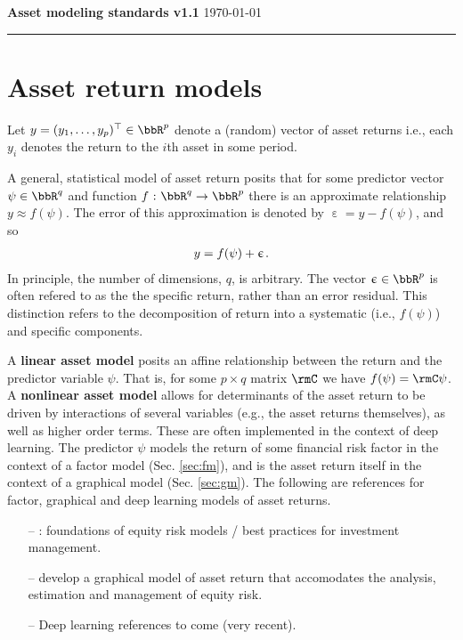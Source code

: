 \documentclass[leqno,12pt]{article}
\begin{document}
\ifxetex
  \let\lsum\sum
  \renewcommand{\sum}{\bm{\lsum}}

  \let\lprod\prod
  \renewcommand{\prod}{\bm{\lprod}}
\else
\fi

\newcommand{\res}{\upepsilon}
\newcommand{\pre}{\psi}
\newcommand{\mv}{\sigma_\rmM}
\newcommand{\mb}{\beta^{\rmM}}
\newcommand{\tcov}{\Sigma}
\newcommand{\hcov}{\bm{\hat}{\Sigma}}

{
\noindent
{\bf Asset modeling standards v1.1}
\noindent
\hfill {\today} \noindent
\rule{\textwidth}{0.01in}

\section{Asset return models}


\begin{mdframed}[style=clean]
Let $y = (y_1, \dots, y_p)^\top \in \bbR^p$ denote a (random) 
vector of asset returns i.e., 
each $y_i$ denotes the return
to the $i$th asset in some period.
\end{mdframed}



A general, statistical model of asset return posits that
for some predictor vector $\pre \in \bbR^q$ and 
function $f \cst \bbR^q \to \bbR^p$ there is an
approximate relationship $y \approx f(\pre)$. The error 
of this 
approximation is denoted by $\res = y - f(\pre)$, and so
\begin{align}
  y = f(\pre) + \res \s .
\end{align}
In principle, the number of dimensions, $q$, is arbitrary.
The vector $\res \in \bbR^p$ is often refered to as the 
the specific return, rather than an error residual. This
distinction refers to the decomposition of return 
into a systematic (i.e., $f(\pre)$) and specific components.

A {\bf linear asset model} posits an affine relationship
between the return and the predictor variable $\pre$.
That is, for some $p \times q$ matrix $\rmC$ we have 
$f(\pre) = \rmC \pre$. 
A {\bf nonlinear asset model} allows for determinants of 
the asset return to be driven by interactions of several 
variables (e.g., the asset returns themselves), as well as
higher order terms. These are
often implemented in the context of deep learning.
The predictor $\pre$ models the 
return of some financial risk factor in the context of a 
factor model (Sec. \ref{sec:fm}), and is the asset return
itself in the context of a graphical model (Sec. \ref{sec:gm}).
The following are references for factor, graphical and 
deep learning models of asset returns.
\begin{itemize}
 \item[--]  : foundations of equity
risk models / best practices for investment management.
 \item[--]  develop a graphical model of asset
return that accomodates the analysis, estimation and management 
of equity risk.
 \item[--] Deep learning references to come (very recent).
\end{itemize}

}
\end{document}
